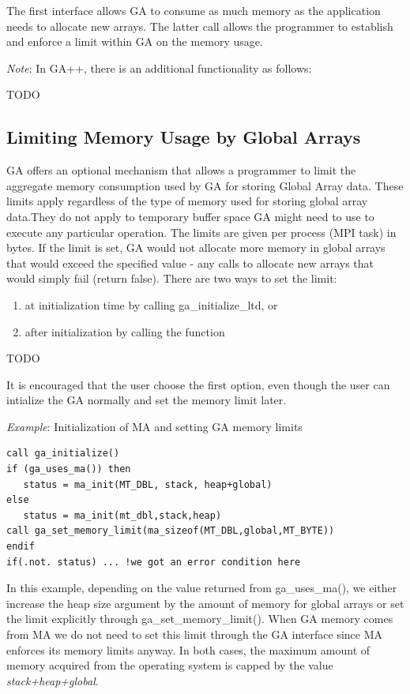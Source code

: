 The first interface allows GA to consume as much memory as the application
needs to allocate new arrays. The latter call allows the programmer to
establish and enforce a limit within GA on the memory usage.

\emph{Note}: In GA++, there is an additional functionality as follows: 

TODO 

\subsection{Limiting Memory Usage by Global Arrays}

GA offers an optional mechanism that allows a programmer to limit the aggregate
memory consumption used by GA for storing Global Array data. These limits apply
regardless of the type of memory used for storing global array data.They do not
apply to temporary buffer space GA might need to use to execute any particular
operation. The limits are given per process (MPI task) in bytes. If the limit
is set, GA would not allocate more memory in global arrays that would exceed
the specified value - any calls to allocate new arrays that would simply fail
(return false). There are two ways to set the limit:
\begin{enumerate}
\item at initialization time by calling ga\_initialize\_ltd, or 
\item after initialization by calling the function
\end{enumerate}

TODO

It is encouraged that the user choose the first option, even though the user
can intialize the GA normally and set the memory limit later.

\emph{Example}: Initialization of MA and setting GA memory limits
\begin{verbatim}
call ga_initialize() 
if (ga_uses_ma()) then
   status = ma_init(MT_DBL, stack, heap+global) 
else 
   status = ma_init(mt_dbl,stack,heap) 
call ga_set_memory_limit(ma_sizeof(MT_DBL,global,MT_BYTE)) 
endif 
if(.not. status) ... !we got an error condition here
\end{verbatim}
In this example, depending on the value returned from ga\_uses\_ma(), we either
increase the heap size argument by the amount of memory for global arrays or
set the limit explicitly through ga\_set\_memory\_limit().  When GA memory
comes from MA we do not need to set this limit through the GA interface since
MA enforces its memory limits anyway. In both cases, the maximum amount of
memory acquired from the operating system is capped by the value
\emph{stack+heap+global}. 


